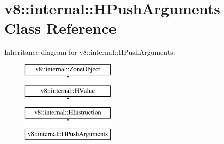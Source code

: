 \hypertarget{classv8_1_1internal_1_1_h_push_arguments}{}\section{v8\+:\+:internal\+:\+:H\+Push\+Arguments Class Reference}
\label{classv8_1_1internal_1_1_h_push_arguments}
Inheritance diagram for v8\+:\+:internal\+:\+:H\+Push\+Arguments\+:\begin{figure}[H]
\begin{center}
\leavevmode
\includegraphics[height=4.000000cm]{classv8_1_1internal_1_1_h_push_arguments}
\end{center}
\end{figure}
